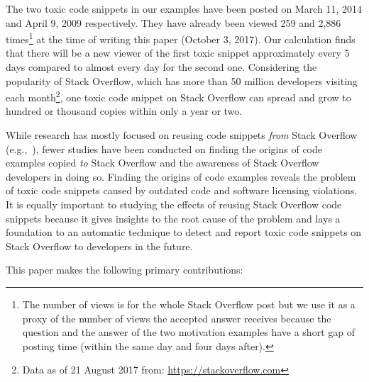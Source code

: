 \documentclass[10pt,journal,compsoc]{IEEEtran}
\begin{document}
The two toxic code snippets in our examples have been posted on March 11, 2014 and
April 9, 2009 respectively. They have already been viewed 259 and 2,886 times\footnote{The number of views
is for the whole Stack Overflow post but we use it as a proxy of the number of views the accepted answer receives
because the question and the answer of the two motivation examples have a short gap of posting time (within the same day and four days after).} 
at
the time of writing this paper (October 3, 2017). Our calculation finds that
there will be a new viewer of the first toxic snippet approximately every 5
days compared to almost every day for the second one. 
Considering the popularity of Stack Overflow, which has more than 50 million developers visiting
each month\footnote{Data as of 21 August 2017 from:
	\url{https://stackoverflow.com}}, one toxic code snippet on Stack Overflow can
spread and grow to hundred or thousand copies within only a year or two.


While research has mostly focused on reusing code snippets \emph{from} Stack
Overflow (e.g.,~\cite{Keivanloo2014,An2017,Yang2016}), fewer studies have been
conducted on finding the origins of code examples copied \emph{to} Stack
Overflow and the awareness of Stack Overflow developers in doing so. Finding the
origins of code examples reveals the problem of toxic code snippets
caused by outdated code and software licensing violations. It is equally
important to studying the effects of reusing Stack Overflow code snippets
because it gives insights to the root cause of the problem and lays a
foundation to an automatic technique to detect and report
toxic code snippets on Stack Overflow to developers in the future.

This paper makes the following primary contributions:
\end{document}
